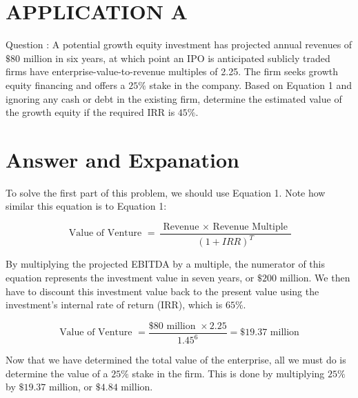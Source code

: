 \documentclass[11pt]{article}
\begin{document}
\section*{APPLICATION A}
Question : A potential growth equity investment has projected annual revenues of $\$ 80$ million in six years, at which point an IPO is anticipated sublicly traded firms have enterprise-value-to-revenue multiples of 2.25. The firm seeks growth equity financing and offers a $25 \%$ stake in the company. Based on Equation 1 and ignoring any cash or debt in the existing firm, determine the estimated value of the growth equity if the required IRR is $45 \%$.

\section*{Answer and Expanation}
To solve the first part of this problem, we should use Equation 1. Note how similar this equation is to Equation 1:

$$
\text { Value of Venture }=\frac{\text { Revenue } \times \text { Revenue Multiple }}{(1+I R R)^{T}}
$$

By multiplying the projected EBITDA by a multiple, the numerator of this equation represents the investment value in seven years, or $\$ 200$ million. We then have to discount this investment value back to the present value using the investment's internal rate of return (IRR), which is $65 \%$.

$$
\text { Value of Venture }=\frac{\$ 80 \text { million } \times 2.25}{1.45^{6}}=\$ 19.37 \text { million }
$$

Now that we have determined the total value of the enterprise, all we must do is determine the value of a $25 \%$ stake in the firm. This is done by multiplying $25 \%$ by $\$ 19.37$ million, or $\$ 4.84$ million.
\end{document}
